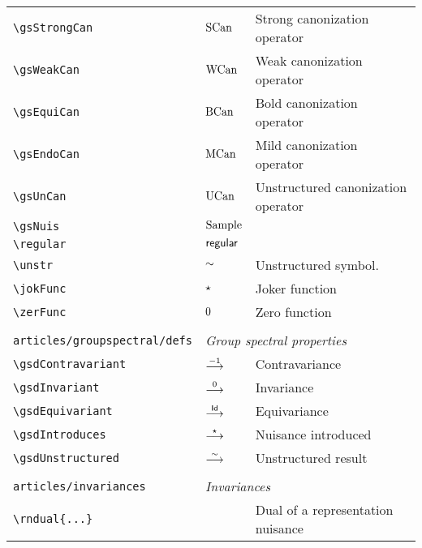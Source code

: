\begin{longtable}{lll}
 {\color[rgb]{0.5,0.5,0.5}\texttt{\textbackslash gsStrongCan}} & $\text{SCan}$ &  Strong canonization operator\\ 
 {\color[rgb]{0.5,0.5,0.5}\texttt{\textbackslash gsWeakCan}} & $\text{WCan}$ &  Weak canonization operator\\ 
 {\color[rgb]{0.5,0.5,0.5}\texttt{\textbackslash gsEquiCan}} & $\text{BCan}$ &  Bold canonization operator\\ 
 {\color[rgb]{0.5,0.5,0.5}\texttt{\textbackslash gsEndoCan}} & $\text{MCan}$ &  Mild canonization operator\\ 
 {\color[rgb]{0.5,0.5,0.5}\texttt{\textbackslash gsUnCan}} & $\text{UCan}$ &  Unstructured canonization operator\\ 
 {\color[rgb]{0.5,0.5,0.5}\texttt{\textbackslash gsNuis}} & $\text{Sample}$ &  \\ 
 {\color[rgb]{0.5,0.5,0.5}\texttt{\textbackslash regular}} & $\mathsf{regular}$ & \\ 
 {\color[rgb]{0.5,0.5,0.5}\texttt{\textbackslash unstr}} & $\sim$ &  Unstructured symbol.\\ 
 {\color[rgb]{0.5,0.5,0.5}\texttt{\textbackslash jokFunc}} & $\star$ &  Joker function\\ 
 {\color[rgb]{0.5,0.5,0.5}\texttt{\textbackslash zerFunc}} & $0$ &  Zero function\\ 
  &  & \\ 
 {\color[rgb]{0.5,0.5,0.5}\texttt{articles/groupspectral/defs}} & \multicolumn{2}{l}{\emph{Group spectral properties}}\\ 
 \hline
{\color[rgb]{0.5,0.5,0.5}\texttt{\textbackslash gsdContravariant}} & $\stackrel{-1}{\longrightarrow}$ &  Contravariance\\ 
 {\color[rgb]{0.5,0.5,0.5}\texttt{\textbackslash gsdInvariant}} & $\stackrel{0}{\longrightarrow}$ &  Invariance\\ 
 {\color[rgb]{0.5,0.5,0.5}\texttt{\textbackslash gsdEquivariant}} & $\stackrel{\mathsf{Id}}{\longrightarrow}$ &  Equivariance\\ 
 {\color[rgb]{0.5,0.5,0.5}\texttt{\textbackslash gsdIntroduces}} & $\stackrel{\star}{\longrightarrow}$ &  Nuisance introduced\\ 
 {\color[rgb]{0.5,0.5,0.5}\texttt{\textbackslash gsdUnstructured}} & $\stackrel{\sim}{\longrightarrow}$ &  Unstructured result\\ 
  &  & \\ 
 {\color[rgb]{0.5,0.5,0.5}\texttt{articles/invariances}} & \multicolumn{2}{l}{\emph{Invariances}}\\ 
 \hline
{\color[rgb]{0.5,0.5,0.5}\texttt{\textbackslash rndual\{...\}}} &  &  Dual of a representation nuisance\\ 

\end{longtable}
